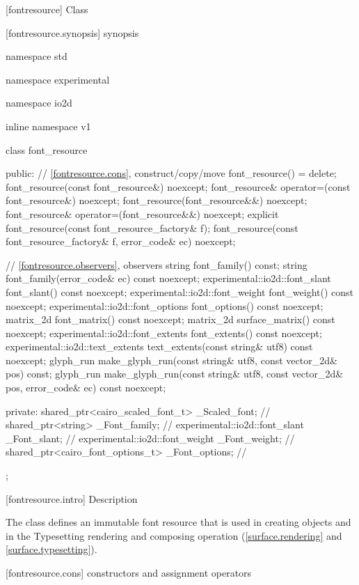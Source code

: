 
 [fontresource] {Class }

 [fontresource.synopsis] { synopsis}

\begin{codeblock}
namespace std { namespace experimental { namespace io2d { inline namespace v1 {
  class font_resource {
  public:
    // \ref{fontresource.cons}, construct/copy/move
    font_resource() = delete;
    font_resource(const font_resource&) noexcept;
    font_resource& operator=(const font_resource&) noexcept;
    font_resource(font_resource&&) noexcept;
    font_resource& operator=(font_resource&&) noexcept;
    explicit font_resource(const font_resource_factory& f);
    font_resource(const font_resource_factory& f, error_code& ec) noexcept;

    // \ref{fontresource.observers}, observers
    string font_family() const;
    string font_family(error_code& ec) const noexcept;
    experimental::io2d::font_slant font_slant() const noexcept;
    experimental::io2d::font_weight font_weight() const noexcept;
    experimental::io2d::font_options font_options() const noexcept;
    matrix_2d font_matrix() const noexcept;
    matrix_2d surface_matrix() const noexcept;
    experimental::io2d::font_extents font_extents() const noexcept;
    experimental::io2d::text_extents text_extents(const string& utf8) const 
      noexcept;
    glyph_run make_glyph_run(const string& utf8, const vector_2d& pos) const;
    glyph_run make_glyph_run(const string& utf8, const vector_2d& pos, 
      error_code& ec) const noexcept;

  private:
    shared_ptr<cairo_scaled_font_t> _Scaled_font;	// \expos
    shared_ptr<string> _Font_family;			// \expos
    experimental::io2d::font_slant _Font_slant;		// \expos
    experimental::io2d::font_weight _Font_weight;	// \expos
    shared_ptr<cairo_font_options_t> _Font_options;	// \expos
  };
} } } }
\end{codeblock}

 [fontresource.intro] { Description}

\pnum
{}
\pnum
The  class defines an immutable font resource that is used in creating  objects and in the Typesetting rendering and composing operation (\ref{surface.rendering} and \ref{surface.typesetting}).

 [fontresource.cons] { constructors and assignment operators}

